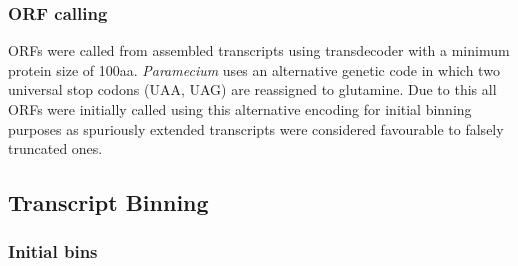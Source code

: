 \subsubsection{ORF calling}

ORFs were called from assembled transcripts using transdecoder \citep{Haas2013} with 
a minimum protein size of 100aa.  \textit{Paramecium} uses an alternative
genetic code in which two universal stop codons (UAA, UAG) are reassigned to glutamine.
Due to this all ORFs were initially called using this alternative encoding for initial binning
purposes as spuriously extended transcripts were considered favourable to falsely truncated
ones. 


\subsection{Transcript Binning}

\subsubsection{Initial bins}

